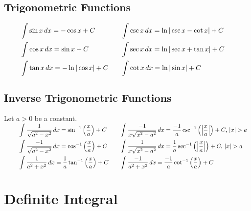\documentclass[11pt]{article}
\begin{document}
\subsection{Trigonometric Functions}
$
  \begin{array}{l@{\qquad}l}
    \qquad\displaystyle \int \sin x\,dx = -\cos x+C 
    & \displaystyle \int \csc x\,dx = \ln|\csc x -\cot x|+C\\[10pt]
    \qquad\displaystyle \int \cos x\,dx = \sin x+C
    &\displaystyle \int \sec x\,dx = \ln|\sec x+\tan x|+C \\[10pt]
    \qquad\displaystyle \int \tan x \,dx= -\ln|\cos x|+C
    & \displaystyle \int \cot x \,dx= \ln|\sin x|+C
  \end{array}
$
\subsection{Inverse Trigonometric Functions}
Let $a > 0$ be a constant.\\
$
  \begin{array}{l@{\qquad}l}
      \qquad\displaystyle \int \frac{1}{\sqrt{a^2 - x^2}}\,dx = \sin^{-1}\left(\frac{x}{a}\right) + C
      & \displaystyle \int \frac{-1}{x\sqrt{x^2 - a^2}}\,dx = \frac{-1}{a} \csc^{-1}\left(\left| \frac{x}{a} \right|\right) + C, \, |x| > a\\[10pt]
      \qquad\displaystyle \int \frac{-1}{\sqrt{a^2 - x^2}}\,dx = \cos^{-1}\left(\frac{x}{a}\right) + C
      & \displaystyle\int \frac{1}{x\sqrt{x^2 - a^2}}\,dx = \frac{1}{a} \sec^{-1}\left(\left| \frac{x}{a} \right|\right) + C, \, |x| > a\\[10pt]
      \qquad\displaystyle\int \frac{1}{a^2 + x^2}\,dx = \frac{1}{a} \tan^{-1}\left(\frac{x}{a}\right) + C
      & \displaystyle \int \frac{-1}{a^2 + x^2}\,dx = \frac{-1}{a} \cot^{-1}\left(\frac{x}{a}\right) + C
  \end{array}
$
\section{Definite Integral}
\end{document}
